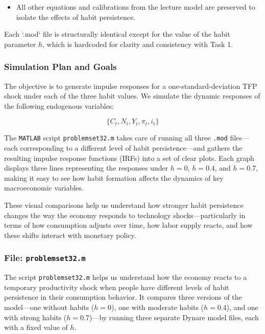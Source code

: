 \documentclass[12pt,a4paper,notitlepage]{article}
\numberwithin{equation}{section}
\begin{document}
\begin{itemize}
\begin{itemize}
\begin{itemize}
    \item All other equations and calibrations from the lecture model are preserved to isolate the effects of habit persistence.
\end{itemize}


Each `.mod` file is structurally identical except for the value of the habit parameter \( h \), which is hardcoded for clarity and consistency with Task 1.

\subsubsection{   Simulation Plan and Goals}


The objective is to generate impulse responses for a one-standard-deviation TFP shock under each of the three habit values. We simulate the dynamic responses of the following endogenous variables:

\[
\{C_t, N_t, Y_t, \pi_t, i_t\}
\]

The \texttt{MATLAB} script \texttt{problemset32.m} takes care of running all three \texttt{.mod} files—each corresponding to a different level of habit persistence—and gathers the resulting impulse response functions (IRFs) into a set of clear plots. Each graph displays three lines representing the responses under \( h = 0 \), \( h = 0.4 \), and \( h = 0.7 \), making it easy to see how habit formation affects the dynamics of key macroeconomic variables.

\vspace{1em}

These visual comparisons help us understand how stronger habit persistence changes the way the economy responds to technology shocks—particularly in terms of how consumption adjusts over time, how labor supply reacts, and how these shifts interact with monetary policy.


\subsubsection{   File: \texttt{problemset32.m}}


The script \texttt{problemset32.m} helps us understand how the economy reacts to a temporary productivity shock when people have different levels of habit persistence in their consumption behavior. It compares three versions of the model—one without habits (\( h = 0 \)), one with moderate habits (\( h = 0.4 \)), and one with strong habits (\( h = 0.7 \))—by running three separate Dynare model files, each with a fixed value of \( h \).


\end{itemize}
\end{itemize}
\end{document}
